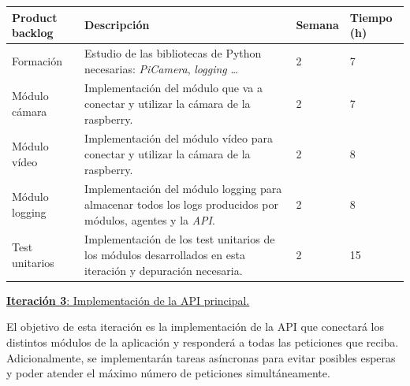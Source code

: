 \begin{table}[h!]
\begin{tabular}{|p{4cm}|p{7.2cm}|p{1.3cm}|p{2.1cm}|}
\hline
\rowcolor[HTML]{9B9B9B} 
{\color[HTML]{FFFFFF} Product backlog} & {\color[HTML]{FFFFFF} Descripción}                                  & {\color[HTML]{FFFFFF} Semana} & {\color[HTML]{FFFFFF}Tiempo (h)} \\ \hline
Formación                             & Estudio de las bibliotecas de Python necesarias: \textit{PiCamera}, \textit{logging} \ldots
                                        & 2                             & 7                                   \\ \hline
Módulo cámara                        & Implementación del módulo que va a conectar y utilizar la cámara de la raspberry.
                                  & 2                             & 7                                  \\ \hline
Módulo vídeo                          & Implementación del módulo vídeo para conectar y utilizar la cámara de la raspberry.
          & 2                             & 8                                   \\ \hline
Módulo logging                         & Implementación del módulo logging para almacenar todos los logs producidos por módulos, agentes y la \textit{API}.
          & 2                             & 8                                   \\ \hline

Test unitarios                         & Implementación de los test unitarios de los módulos desarrollados en esta iteración y depuración necesaria. & 2 & 15 \\ \hline  

\end{tabular}
\end{table}

\newpage


\large{\underline{\textbf{Iteración 3}: Implementación de la API principal.}}
\vspace{0.3cm}

\normalsize

El objetivo de esta iteración es la implementación de la API que conectará los distintos módulos de la aplicación y responderá a todas las peticiones que reciba. Adicionalmente, se implementarán tareas asíncronas para evitar posibles esperas y poder atender el máximo número de peticiones simultáneamente.

